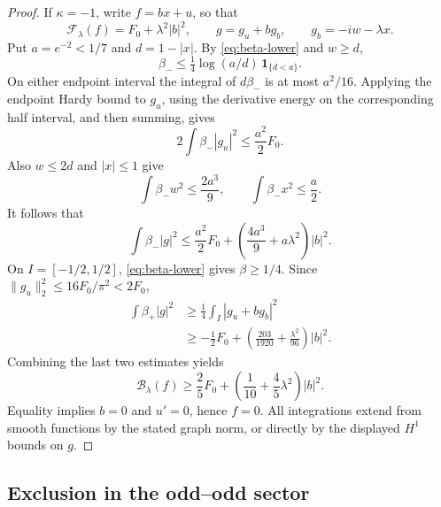 \documentclass[reqno,11pt]{amsart}
\numberwithin{equation}{section}
\theoremstyle{remark}
\begin{document}
\begin{proof}
If $\kappa=-1$, write $f=bx+u$, so that
\[
 \mathcal F_\lambda(f)=F_0+\lambda^2|b|^2,
 \qquad g=g_u+b g_b,\qquad g_b=-iw-\lambda x.
\]
Put $a=e^{-2}<1/7$ and $d=1-|x|$. By
\eqref{eq:beta-lower} and $w\geq d$,
\[
 \beta_-\leq\tfrac14\log(a/d)\,\mathbf1_{\{d<a\}}.
\]
On either endpoint interval the integral of $d\beta_-$ is at
most $a^2/16$. Applying the endpoint Hardy bound to $g_u$,
using the derivative energy on the corresponding half interval,
and then summing, gives
\[
 2\int\beta_-|g_u|^2\leq\frac{a^2}{2}F_0.
\]
Also $w\leq2d$ and $|x|\leq1$ give
\[
 \int\beta_-w^2\leq\frac{2a^3}{9},\qquad
 \int\beta_-x^2\leq\frac a2.
\]
It follows that
\[
 \int\beta_-|g|^2\leq
 \frac{a^2}{2}F_0+\left(\frac{4a^3}{9}+a\lambda^2\right)|b|^2.
\]
On $I=[-1/2,1/2]$, \eqref{eq:beta-lower} gives $\beta\geq1/4$.
Since $\|g_u\|_2^2\leq16F_0/\pi^2<2F_0$,
\begin{align*}
 \int\beta_+|g|^2
 &\geq\tfrac14\int_I|g_u+b g_b|^2\\
 &\geq-\tfrac12F_0+
                \left(\frac{203}{1920}+\frac{\lambda^2}{96}\right)|b|^2.
\end{align*}
Combining the last two estimates yields
\[
 \mathcal B_\lambda(f)\geq
 \frac25F_0+\left(\frac1{10}+\frac45\lambda^2\right)|b|^2.
\]
Equality implies $b=0$ and $u'=0$, hence $f=0$.
All integrations extend from smooth functions by the stated graph
norm, or directly by the displayed $H^1$ bounds on $g$.
\end{proof}

\subsection{Exclusion in the odd--odd sector}
\end{document}
